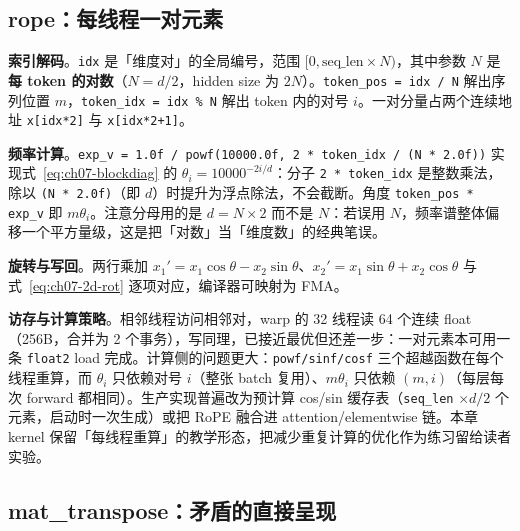 \subsection{rope：每线程一对元素}



\textbf{索引解码}。\texttt{idx} 是「维度对」的全局编号，范围 $[0, \text{seq\_len} \times N)$，其中参数 $N$ 是\textbf{每 token 的对数}（$N = d/2$，hidden size 为 $2N$）。\texttt{token\_pos = idx / N} 解出序列位置 $m$，\texttt{token\_idx = idx \% N} 解出 token 内的对号 $i$。一对分量占两个连续地址 \texttt{x[idx*2]} 与 \texttt{x[idx*2+1]}。

\textbf{频率计算}。\texttt{exp\_\allowbreak{}v =\allowbreak{} 1.0f /\allowbreak{} powf\allowbreak{}(10000.0f,\allowbreak{} 2 * token\_\allowbreak{}idx /\allowbreak{} (N * 2.0f))} 实现式~\eqref{eq:ch07-blockdiag} 的 $\theta_i = 10000^{-2i/d}$：分子 \texttt{2 * token\_idx} 是整数乘法，除以 \texttt{(N * 2.0f)}（即 $d$）时提升为浮点除法，不会截断。角度 \texttt{token\_pos * exp\_v} 即 $m\theta_i$。注意分母用的是 $d = N \times 2$ 而不是 $N$：若误用 $N$，频率谱整体偏移一个平方量级，这是把「对数」当「维度数」的经典笔误。

\textbf{旋转与写回}。两行乘加 $x_1' = x_1\cos\theta - x_2\sin\theta$、$x_2' = x_1\sin\theta + x_2\cos\theta$ 与式~\eqref{eq:ch07-2d-rot} 逐项对应，编译器可映射为 FMA。

\textbf{访存与计算策略}。相邻线程访问相邻对，warp 的 32 线程读 64 个连续 float（256B，合并为 2 个事务），写同理，已接近最优但还差一步：一对元素本可用一条 \texttt{float2} load 完成。计算侧的问题更大：\texttt{powf/\allowbreak{}sinf/\allowbreak{}cosf} 三个超越函数在每个线程重算，而 $\theta_i$ 只依赖对号 $i$（整张 batch 复用）、$m\theta_i$ 只依赖 $(m, i)$（每层每次 forward 都相同）。生产实现普遍改为预计算 cos/sin 缓存表（\texttt{seq\_len} $\times d/2$ 个元素，启动时一次生成）或把 RoPE 融合进 attention/elementwise 链。本章 kernel 保留「每线程重算」的教学形态，把减少重复计算的优化作为练习留给读者实验。

\subsection{mat\_transpose：矛盾的直接呈现}



